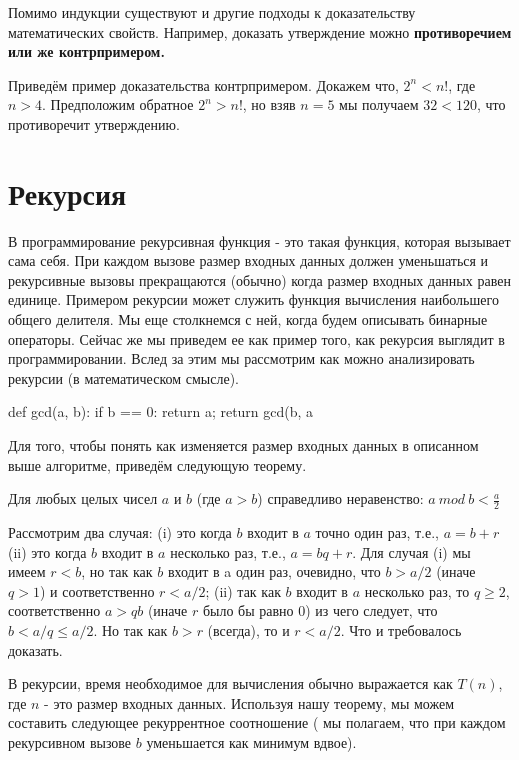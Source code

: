 Помимо индукции существуют и другие подходы к доказательству математических свойств. Например,
доказать утверждение можно \bf{противоречием} или же контрпримером. 

Приведём пример доказательства контрпримером. Докажем что, $2^n<n!$, где $n>4$. Предположим обратное 
$2^n>n!$, но взяв $n=5$ мы получаем $32<120$, что противоречит утверждению.

\section{Рекурсия}

В программирование рекурсивная функция - это такая функция, которая вызывает сама себя. При 
каждом вызове размер входных данных должен уменьшаться и рекурсивные вызовы
прекращаются (обычно) когда размер входных данных равен единице. Примером рекурсии 
может служить функция вычисления наибольшего общего делителя. Мы еще столкнемся с ней,
когда будем описывать бинарные операторы. Сейчас же мы приведем ее как пример 
того, как рекурсия выглядит в программировании. Вслед за этим мы рассмотрим как
можно анализировать рекурсии (в математическом смысле).

\begin{python}
def gcd(a, b):
 if b == 0:
  return a;
 return gcd(b, a %
\end{python}

Для того, чтобы понять как изменяется размер входных данных в описанном выше алгоритме, 
приведём следующую теорему.

\begin{theorem}
Для любых целых чисел $a$ и $b$ (где $a>b$) справедливо неравенство: $a\ mod\ b < \frac{a}{2}$
\end{theorem}

Рассмотрим два случая: (i) это когда $b$ входит в $a$ точно один раз, т.е., $a = b + r$
(ii) это когда $b$ входит в $a$ несколько раз, т.е., $a = bq + r$.
Для случая (i) мы имеем $r < b$, но так как $b$ входит в a один раз, очевидно, что
$b > a/2$ (иначе $q > 1$) и соответственно $r < a/2$; (ii) так как $b$ входит в $a$ несколько раз, то $q \ge 2$,
соответственно $a > qb$ (иначе $r$ было бы равно $0$) из чего следует, 
что $b < a/q \le a/2$. Но так как $b > r$ (всегда), то и $r < a/2$. Что и требовалось доказать.

В рекурсии, время необходимое для вычисления обычно выражается как $T(n)$, где $n$ - это
размер входных данных. Используя нашу теорему, мы можем составить следующее рекуррентное соотношение (
мы полагаем, что при каждом рекурсивном вызове $b$ уменьшается как минимум вдвое).


